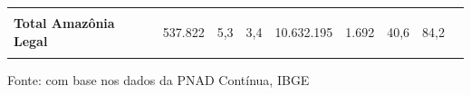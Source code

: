 \documentclass[8pt]{beamer}
\begin{document}
\begin{frame}[label=amzcod2dig]{}
\begin{table}[H]
{\begin{threeparttable}
\begin{tabular}{l*{8}{r}}
\\
\hline
\\
\textbf{Total Amazônia Legal}               &     537.822&         5,3&         3,4&  10.632.195&       1.692&        40,6&        84,2\\
\\
\bottomrule
\end{tabular}
\begin{tablenotes}
\item \scriptsize{Fonte: com base nos dados da PNAD Contínua, IBGE}
\end{tablenotes}
\end{threeparttable}
}
\end{table}

\end{frame}

\begin{frame}[label=amzcod2dig]{}


\end{frame}
\end{document}
